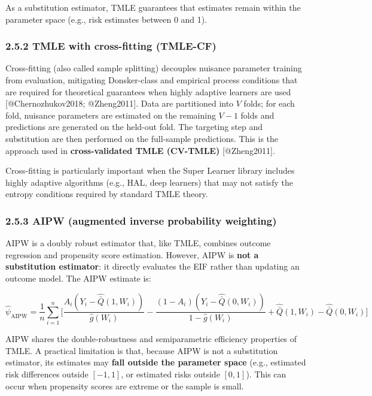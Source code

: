 \documentclass[
  letterpaper,
  DIV=11,
  numbers=noendperiod]{scrartcl}
\begin{document}
As a substitution estimator, TMLE guarantees that estimates remain
within the parameter space (e.g., risk estimates between 0 and 1).

\subsubsection{2.5.2 TMLE with cross-fitting
(TMLE-CF)}\label{tmle-with-cross-fitting-tmle-cf}

Cross-fitting (also called sample splitting) decouples nuisance
parameter training from evaluation, mitigating Donsker-class and
empirical process conditions that are required for theoretical
guarantees when highly adaptive learners are used {[}@Chernozhukov2018;
@Zheng2011{]}. Data are partitioned into \(V\) folds; for each fold,
nuisance parameters are estimated on the remaining \(V-1\) folds and
predictions are generated on the held-out fold. The targeting step and
substitution are then performed on the full-sample predictions. This is
the approach used in \textbf{cross-validated TMLE (CV-TMLE)}
{[}@Zheng2011{]}.

Cross-fitting is particularly important when the Super Learner library
includes highly adaptive algorithms (e.g., HAL, deep learners) that may
not satisfy the entropy conditions required by standard TMLE theory.

\subsubsection{2.5.3 AIPW (augmented inverse probability
weighting)}\label{aipw-augmented-inverse-probability-weighting}

AIPW is a doubly robust estimator that, like TMLE, combines outcome
regression and propensity score estimation. However, AIPW is \textbf{not
a substitution estimator}: it directly evaluates the EIF rather than
updating an outcome model. The AIPW estimate is:

\[\hat{\psi}_{\text{AIPW}} = \frac{1}{n}\sum_{i=1}^n \Biggl[\frac{A_i(Y_i - \hat{\bar{Q}}(1, W_i))}{\hat{g}(W_i)} - \frac{(1-A_i)(Y_i - \hat{\bar{Q}}(0, W_i))}{1 - \hat{g}(W_i)} + \hat{\bar{Q}}(1, W_i) - \hat{\bar{Q}}(0, W_i)\Biggr]\]

AIPW shares the double-robustness and semiparametric efficiency
properties of TMLE. A practical limitation is that, because AIPW is not
a substitution estimator, its estimates may \textbf{fall outside the
parameter space} (e.g., estimated risk differences outside \([-1, 1]\),
or estimated risks outside \([0, 1]\)). This can occur when propensity
scores are extreme or the sample is small.
\end{document}
